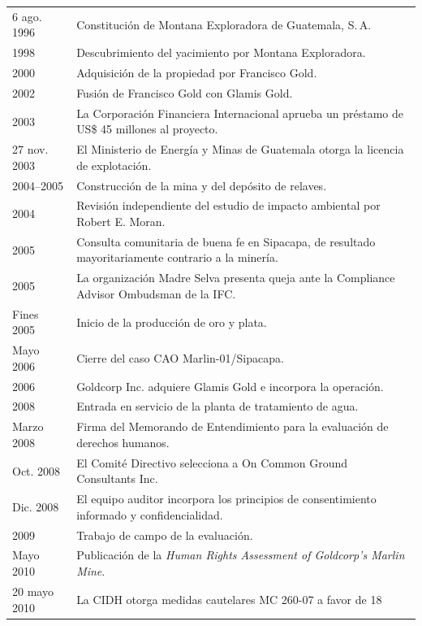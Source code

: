 \begin{footnotesize}
\begin{longtable}{@{}L{2.6cm} L{12.2cm}@{}}
  6 ago. 1996  & Constitución de Montana Exploradora de Guatemala, S.\,A. \\
  1998         & Descubrimiento del yacimiento por Montana Exploradora. \\
  2000         & Adquisición de la propiedad por Francisco Gold. \\
  2002         & Fusión de Francisco Gold con Glamis Gold. \\
  2003         & La Corporación Financiera Internacional aprueba un préstamo de
                 US\$ 45 millones al proyecto. \\
  27 nov. 2003 & El Ministerio de Energía y Minas de Guatemala otorga la licencia
                 de explotación. \\
  2004--2005   & Construcción de la mina y del depósito de relaves. \\
  2004         & Revisión independiente del estudio de impacto ambiental por
                 Robert E. Moran. \\
  2005         & Consulta comunitaria de buena fe en Sipacapa, de resultado
                 mayoritariamente contrario a la minería. \\
  2005         & La organización Madre Selva presenta queja ante la Compliance
                 Advisor Ombudsman de la {IFC}. \\
  Fines 2005   & Inicio de la producción de oro y plata. \\
  Mayo 2006    & Cierre del caso {CAO} Marlin-01/Sipacapa. \\
  2006         & Goldcorp Inc. adquiere Glamis Gold e incorpora la operación. \\
  2008         & Entrada en servicio de la planta de tratamiento de agua. \\
  Marzo 2008   & Firma del Memorando de Entendimiento para la evaluación de
                 derechos humanos. \\
  Oct. 2008    & El Comité Directivo selecciona a On Common Ground Consultants Inc. \\
  Dic. 2008    & El equipo auditor incorpora los principios de consentimiento
                 informado y confidencialidad. \\
  2009         & Trabajo de campo de la evaluación. \\
  Mayo 2010    & Publicación de la \textit{Human Rights Assessment of Goldcorp's
                 Marlin Mine}. \\
  20 mayo 2010 & La {CIDH} otorga medidas cautelares {MC} 260-07 a favor de 18

\end{longtable}
\end{footnotesize}
